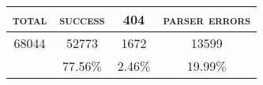 \begin{tabular}{cccc} 
 \toprule 
\textsc{total} & \textsc{success} & \textsc{404} & \textsc{parser errors} \\ 
 \midrule 
68044&52773&1672&13599\\ 
&77.56$\%$&2.46$\%$&19.99$\%$\\ 
\bottomrule 
 \end{tabular}
